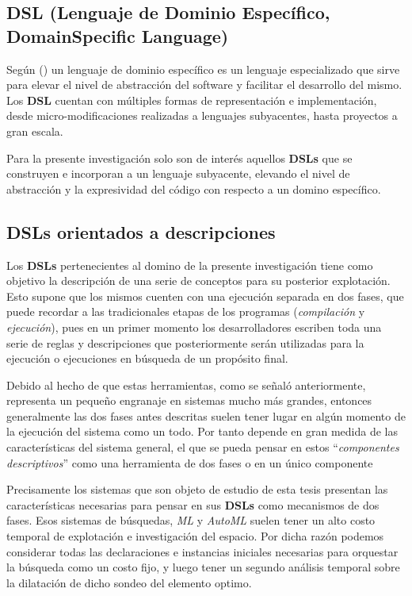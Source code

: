\subsection{DSL (Lenguaje de Dominio Específico, Domain\newline Specific Language)}

Según (\cite{langlois2007dsl}) un lenguaje de dominio específico es un lenguaje especializado que sirve
para elevar el nivel de abstracción del software y facilitar el desarrollo del mismo.
Los {\bf DSL} cuentan con múltiples formas de representación e implementación, desde
micro-modificaciones realizadas a lenguajes subyacentes, hasta proyectos a gran escala.

Para la presente investigación solo son de interés aquellos {\bf DSLs} que se construyen e
incorporan a un lenguaje subyacente, elevando el nivel de abstracción y la expresividad
del código con respecto a un domino específico.

\subsection{DSLs orientados a descripciones}

Los {\bf DSLs} pertenecientes al domino de la presente investigación tiene como objetivo
la descripción de una serie de conceptos para su posterior explotación. Esto supone que
los mismos cuenten con una ejecución separada en dos fases, que puede recordar a las
tradicionales etapas de los programas ({\it compilación} y {\it ejecución}), pues en un
primer momento los desarrolladores escriben toda una serie de reglas y descripciones
que posteriormente serán utilizadas para la ejecución o ejecuciones en búsqueda de un
propósito final.

Debido al hecho de que estas herramientas, como se señaló anteriormente, representa un
pequeño engranaje en sistemas mucho más grandes, entonces generalmente las dos fases
antes descritas suelen tener lugar en algún momento de la ejecución del sistema como un
todo. Por tanto depende en gran medida de las características del sistema general, el
que se pueda pensar en estos ``{\it componentes descriptivos}'' como una herramienta de dos
fases o en un único componente

Precisamente los sistemas que son objeto de estudio de esta tesis presentan las
características necesarias para pensar en sus {\bf DSLs} como mecanismos de dos fases.
Esos sistemas de búsquedas, {\it ML} y {\it AutoML} suelen tener un alto costo temporal de
explotación e investigación del espacio. Por dicha razón podemos considerar todas las
declaraciones e instancias iniciales necesarias para orquestar la búsqueda como un
costo fijo, y luego tener un segundo análisis temporal sobre la dilatación de dicho
sondeo del elemento optimo.

